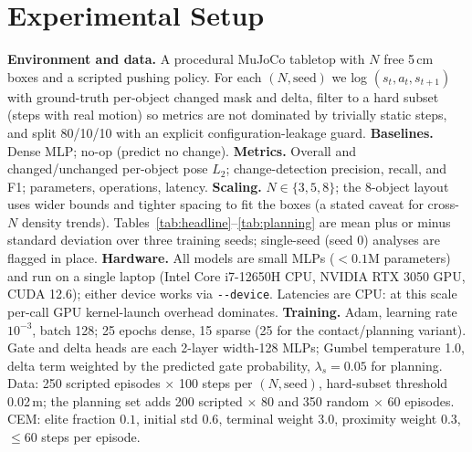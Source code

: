 \documentclass[conference]{IEEEtran}
\begin{document}
\section{Experimental Setup}\label{sec:setup}
\textbf{Environment and data.} A procedural MuJoCo tabletop with $N$ free 5\,cm boxes
and a scripted pushing policy. For each $(N,\text{seed})$ we log $(s_t,a_t,s_{t+1})$
with ground-truth per-object changed mask and delta, filter to a hard subset (steps
with real motion) so metrics are not dominated by trivially static steps, and split
80/10/10 with an explicit configuration-leakage guard. \textbf{Baselines.} Dense MLP;
no-op (predict no change). \textbf{Metrics.} Overall and changed/unchanged per-object
pose $L_2$; change-detection precision, recall, and F1; parameters, operations,
latency. \textbf{Scaling.} $N\in\{3,5,8\}$; the 8-object layout uses wider bounds and
tighter spacing to fit the boxes (a stated caveat for cross-$N$ density trends).
Tables~\ref{tab:headline}--\ref{tab:planning} are mean plus or minus standard deviation
over three training seeds; single-seed (seed 0) analyses are flagged in place. \textbf{Hardware.} All models are small MLPs ($<0.1$M parameters) and run
on a single laptop (Intel Core i7-12650H CPU, NVIDIA RTX 3050 GPU, CUDA 12.6); either
device works via \texttt{-{}-device}. Latencies are CPU: at this scale per-call
GPU kernel-launch overhead dominates.
\textbf{Training.} Adam, learning rate $10^{-3}$, batch 128; 25 epochs dense, 15 sparse
(25 for the contact/planning variant). Gate and delta heads are each 2-layer width-128
MLPs; Gumbel temperature 1.0, delta term weighted by the predicted gate probability,
$\lambda_s{=}0.05$ for planning. Data: 250 scripted episodes $\times$ 100 steps per
$(N,\text{seed})$, hard-subset threshold 0.02\,m; the planning set adds 200 scripted
$\times$ 80 and 350 random $\times$ 60 episodes. CEM: elite fraction $0.1$, initial std
$0.6$, terminal weight $3.0$, proximity weight $0.3$, $\le$60 steps per episode.
\end{document}
